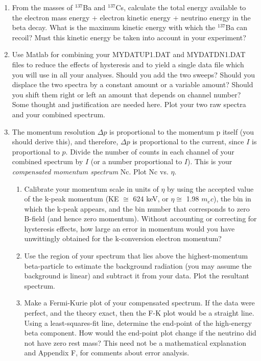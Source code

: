 \documentclass{../lab}
\begin{document}
\begin{enumerate}
    \item From the masses of $^{137}$Ba and $^{137}$Cs, calculate the total energy available to the electron mass energy + electron kinetic energy + neutrino energy in the beta decay. What is the maximum kinetic energy with which the $^{137}$Ba can recoil? Must this kinetic energy be taken into account in your experiment?

    \item Use Matlab for combining your MYDATUP1.DAT and MYDATDN1.DAT files to reduce the effects of hysteresis and to yield a single data file which you will use in all your analyses. Should you add the two sweeps? Should you displace the two spectra by a constant amount or a variable amount? Should you shift them right or left an amount that depends on channel number? Some thought and justification are needed here. Plot your two raw spectra and your combined spectrum.

    \item The momentum resolution $\Delta p$ is proportional to the momentum p itself (you should derive this), and therefore, $\Delta p$ is proportional to the current, since $I$ is proportional to $p$. Divide the number of counts in each channel of your combined spectrum by $I$ (or a number proportional to $I$). This is your \emph{compensated momentum spectrum} Nc. Plot Nc vs. $\eta$.

    \begin{enumerate}
        \item Calibrate your momentum scale in units of $\eta$ by using the accepted value of the k-peak momentum (KE $\cong$ 624 keV, or $\eta \cong$ 1.98 $m_e c$), the bin in which the k-peak appears, and the bin number that corresponds to zero B-field (and hence zero momentum). Without accounting or correcting for hysteresis effects, how large an error in momentum would you have unwittingly obtained for the k-conversion electron momentum?

        \item Use the region of your spectrum that lies above the highest-momentum beta-particle to estimate the background radiation (you may assume the background is linear) and subtract it from your data. Plot the resultant spectrum.

        \item Make a Fermi-Kurie plot of your compensated spectrum. If the data were perfect, and the theory exact, then the F-K plot would be a straight line. Using a least-squares-fit line, determine the end-point of the high-energy beta component. How would the end-point plot change if the neutrino did not have zero rest mass? This need not be a mathematical explanation and Appendix F, for comments about error analysis.


\end{enumerate}
\end{enumerate}
\end{document}
